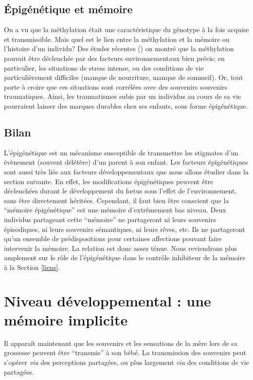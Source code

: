 \documentclass[french]{article}
\begin{document}
			\subsection{Épigénétique et mémoire}
			
				On a vu que la méthylation était une caractéristique du génotype à la fois acquise et transmissible. Mais quel est le lien entre la méthylation et la mémoire ou l'histoire d'un individu? Des études récentes (\cite{vaiserman2017,meaney2005}) on montré que la méthylation pouvait être déclenchée par des facteurs environnementaux bien précis; en particulier, les situations de stress intense, ou des conditions de vie particulièrement difficiles (manque de nourriture, manque de sommeil). Or, tout porte à croire que ces situations sont corrélées avec des souvenirs souvenirs traumatiques. Ainsi, les traumatismes subis par un individus au cours de sa vie pourraient laisser des marques durables chez ses enfants, sous forme épigénétique.
			
			\subsection{Bilan}
				L'épigénétique est un mécanisme susceptible de transmettre les stigmates d'un évènement (souvent délétère) d'un parent à son enfant. Les facteurs épigénétiques sont aussi très liés aux facteurs développementaux que nous allons étudier dans la section suivante. En effet, les modifications épigénétiques peuvent être déclenchées durant le développement du fœtus sous l'effet de l'environnement, sans être directement héritées. Cependant, il faut bien être conscient que la ``mémoire épigénétique'' est une mémoire d'extrêmement bas niveau. Deux individus partageant cette ``mémoire'' ne partageront ni leurs souvenirs épisodiques, ni leurs souvenirs sémantiques, ni leurs rêves, etc. Ils ne partageront qu'un ensemble de prédispositions pour certaines affections pouvant faire intervenir la mémoire. La relation est donc assez ténue. Nous reviendrons plus amplement sur le rôle de l'épigénétique dans le contrôle inhibiteur de la mémoire à la Section \ref{liens}.
				
		\section{Niveau développemental : une mémoire implicite}\label{develo}
			Il apparaît maintenant que les souvenirs et les sensations de la mère lors de sa grossesse peuvent être ``transmis'' à son bébé. La transmission des souvenirs peut s'opérer \textit{via} des perceptions partagées, ou plus largement \textit{via} des conditions de vie partagées.
\end{document}
